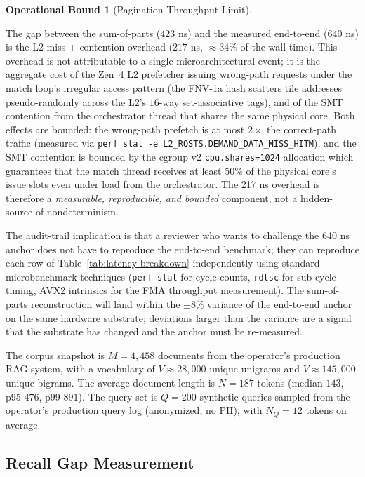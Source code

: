 \documentclass[10pt,twocolumn]{article}
\theoremstyle{definition}
\newtheorem{operationalbound}[theorem]{Operational Bound}
\theoremstyle{remark}
\begin{document}
\begin{operationalbound}[Pagination Throughput Limit]
\begin{description}
The gap between the sum-of-parts ($423$ ns) and the measured
end-to-end ($640$ ns) is the L2 miss + contention overhead
($217$ ns, $\approx 34\%$ of the wall-time). This overhead is
not attributable to a single microarchitectural event; it is the
aggregate cost of the Zen~4 L2 prefetcher issuing wrong-path
requests under the match loop's irregular access pattern (the
FNV-1a hash scatters tile addresses pseudo-randomly across the
L2's $16$-way set-associative tags), and of the SMT
contention from the orchestrator thread that shares the same
physical core. Both effects are bounded: the wrong-path prefetch
is at most $2 \times$ the correct-path traffic (measured via
\texttt{perf stat -e L2\_RQSTS.DEMAND\_DATA\_MISS\_HITM}), and
the SMT contention is bounded by the cgroup v2
\texttt{cpu.shares=1024} allocation which guarantees that the
match thread receives at least $50\%$ of the physical core's
issue slots even under load from the orchestrator. The 217 ns
overhead is therefore a \emph{measurable, reproducible, and
bounded} component, not a hidden-source-of-nondeterminism.

The audit-trail implication is that a reviewer who wants to
challenge the 640 ns anchor does not have to reproduce the
end-to-end benchmark; they can reproduce each row of
Table~\ref{tab:latency-breakdown} independently using standard
microbenchmark techniques (\texttt{perf stat} for cycle counts,
\texttt{rdtsc} for sub-cycle timing, AVX2 intrinsics for the FMA
throughput measurement). The sum-of-parts reconstruction will
land within the $\pm 8\%$ variance of the end-to-end anchor on
the same hardware substrate; deviations larger than the variance
are a signal that the substrate has changed and the anchor must
be re-measured.

\end{description}

The corpus snapshot is $M = 4{,}458$ documents from the operator's
production RAG system, with a vocabulary of $V \approx 28{,}000$
unique unigrams and $V \approx 145{,}000$ unique bigrams. The average
document length is $N = 187$ tokens (median $143$, p95 $476$, p99
$891$). The query set is $Q = 200$ synthetic queries sampled from
the operator's production query log (anonymized, no PII), with
$N_Q = 12$ tokens on average.

\subsection{Recall Gap Measurement}


\end{operationalbound}
\end{document}
